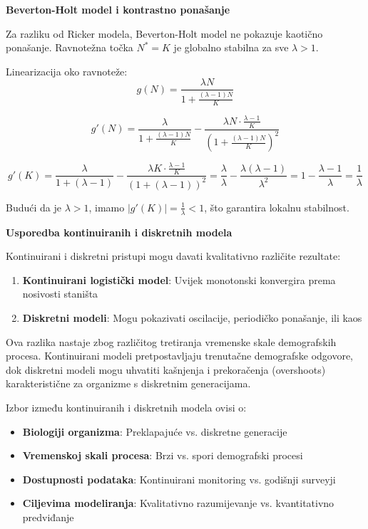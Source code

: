 \documentclass[11pt,oneside]{book}
\begin{document}
\textbf{Beverton-Holt model i kontrastno ponašanje}

Za razliku od Ricker modela, Beverton-Holt model ne pokazuje kaotično ponašanje. Ravnotežna točka $N^* = K$ je globalno stabilna za sve $\lambda > 1$.

Linearizacija oko ravnoteže:
$$g(N) = \frac{\lambda N}{1 + \frac{(\lambda-1)N}{K}}$$

$$g'(N) = \frac{\lambda}{1 + \frac{(\lambda-1)N}{K}} - \frac{\lambda N \cdot \frac{\lambda-1}{K}}{(1 + \frac{(\lambda-1)N}{K})^2}$$

$$g'(K) = \frac{\lambda}{1 + (\lambda-1)} - \frac{\lambda K \cdot \frac{\lambda-1}{K}}{(1 + (\lambda-1))^2} = \frac{\lambda}{\lambda} - \frac{\lambda(\lambda-1)}{\lambda^2} = 1 - \frac{\lambda-1}{\lambda} = \frac{1}{\lambda}$$

Budući da je $\lambda > 1$, imamo $|g'(K)| = \frac{1}{\lambda} < 1$, što garantira lokalnu stabilnost.

\textbf{Usporedba kontinuiranih i diskretnih modela}

Kontinuirani i diskretni pristupi mogu davati kvalitativno različite rezultate:

\begin{enumerate}
	\item \textbf{Kontinuirani logistički model}: Uvijek monotonski konvergira prema nosivosti staništa
	\item \textbf{Diskretni modeli}: Mogu pokazivati oscilacije, periodičko ponašanje, ili kaos
\end{enumerate}

Ova razlika nastaje zbog različitog tretiranja vremenske skale demografskih procesa. Kontinuirani modeli pretpostavljaju trenutačne demografske odgovore, dok diskretni modeli mogu uhvatiti kašnjenja i prekoračenja (overshoots) karakteristične za organizme s diskretnim generacijama.

Izbor između kontinuiranih i diskretnih modela ovisi o:

\begin{itemize}
	\item \textbf{Biologiji organizma}: Preklapajuće vs. diskretne generacije
	\item \textbf{Vremenskoj skali procesa}: Brzi vs. spori demografski procesi  
	\item \textbf{Dostupnosti podataka}: Kontinuirani monitoring vs. godišnji surveyji
	\item \textbf{Ciljevima modeliranja}: Kvalitativno razumijevanje vs. kvantitativno predviđanje
\end{itemize}
\end{document}
